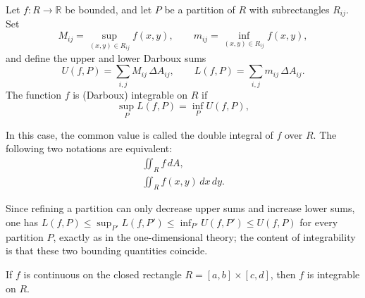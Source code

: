 \begin{definition}
Let $f : R \to \mathbb{R}$ be bounded, and let $P$ be a partition of $R$ with subrectangles $R_{ij}$. Set
\[
M_{ij} = \sup_{(x,y)\in R_{ij}} f(x,y), \qquad m_{ij} = \inf_{(x,y)\in R_{ij}} f(x,y),
\] and define the upper and lower Darboux sums
\[
U(f,P) = \sum_{i,j} M_{ij}\,\Delta A_{ij}, \qquad L(f,P) = \sum_{i,j} m_{ij}\,\Delta A_{ij}.
\]
The function $f$ is (Darboux) integrable on $R$ if
\[
\sup_P L(f,P) = \inf_P U(f,P),
\]

In this case, the common value is called the double integral of $f$ over $R$. The following two notations are equivalent:
\[
\begin{gathered}
\iint_R f \, dA, \\
\iint_R f(x,y)\, dx\, dy.
\end{gathered}
\]

\end{definition}

Since refining a partition can only decrease upper sums and increase lower sums, one has $L(f,P) \leq \sup_{P'} L(f,P') \leq \inf_{P'} U(f,P') \leq U(f,P)$ for every partition $P$, exactly as in the one-dimensional theory; the content of integrability is that these two bounding quantities coincide.

\begin{theorem}
If $f$ is continuous on the closed rectangle $R = [a,b]\times[c,d]$, then $f$ is integrable on $R$.
\end{theorem}

